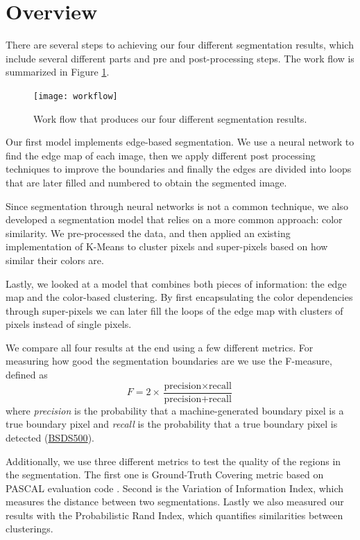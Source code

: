 \documentclass[10pt, twocolumn, twoside]{article}
\newcommand{\squeezeup}{\vspace{-2.5mm}}
\begin{document}
\section{Overview}
\squeezeup
\squeezeup
There are several steps to achieving our four different segmentation results, which include several different parts and pre and post-processing steps. The work flow is summarized in Figure \ref{fig:workflow}. 

\begin{figure}[ht]
	\centering
	\texttt{[image: workflow]}
    \caption{Work flow that produces our four different segmentation results.}
    \label{fig:workflow}
\end{figure}


Our first model implements edge-based segmentation. We use a neural network to find the edge map of each image, then we apply different post processing techniques to improve the boundaries and finally the edges are divided into loops that are later filled and numbered to obtain the segmented image.

Since segmentation through neural networks is not a common technique, we also developed a segmentation model that relies on a more common approach: color similarity. We pre-processed the data, and then applied an existing implementation of K-Means to cluster pixels and super-pixels based on how similar their colors are.

Lastly, we looked at a model that combines both pieces of information: the edge map and the color-based clustering. By first encapsulating the color dependencies through super-pixels we can later fill the loops of the edge map with clusters of pixels instead of single pixels. 

We compare all four results at the end using a few different metrics. For measuring how good the segmentation boundaries are we use the F-measure, defined as 
\[F=2\times\frac{\text{precision}\times \text{recall}}{\text{precision}+\text{recall}}\]where \textit{precision} is the probability that a machine-generated boundary pixel is a true boundary pixel and \textit{recall} is the probability that a true boundary pixel is detected (\href{https://www2.eecs.berkeley.edu/Research/Projects/CS/vision/grouping/resources.html}{BSDS500}).

Additionally, we use three different metrics to test the quality of the regions in the segmentation. The first one is Ground-Truth Covering metric based on PASCAL evaluation code \cite{Everingham}. Second is the Variation of Information Index, which measures the distance between two segmentations. Lastly we also measured our results with the Probabilistic Rand Index, which quantifies similarities between clusterings.
\end{document}

